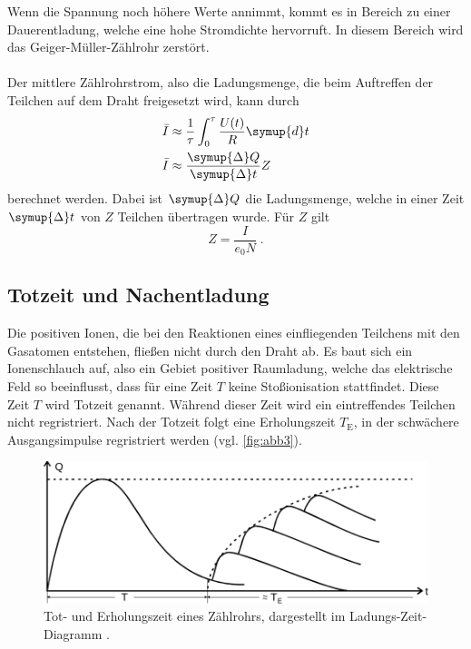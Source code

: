     Wenn die Spannung noch höhere Werte annimmt,
    kommt es in Bereich  zu einer Dauerentladung,
    welche eine hohe Stromdichte hervorruft.
    In diesem Bereich wird das Geiger-Müller-Zählrohr zerstört.\\
    \\
    Der mittlere Zählrohrstrom, also die Ladungsmenge,
    die beim Auftreffen der Teilchen auf dem Draht freigesetzt wird, kann durch
    \begin{align}
        \bar{I} &\approx \frac{1}{\tau} \int_0^{\tau}{\frac{U(t)}{R}} \symup{d}t \\
        \bar{I} &\approx \frac{\symup{\Delta}Q}{\symup{\Delta}t} Z
    \end{align}
    berechnet werden.
    Dabei ist $\symup{\Delta}Q$ die Ladungsmenge,
    welche in einer Zeit $\symup{\Delta}t$ von $Z$ Teilchen übertragen wurde.
    Für $Z$ gilt
    \begin{equation}
      \label{eqn:Teilchenzahl}
      Z = \frac{I}{e_0 N} \; .
    \end{equation}

\subsection{Totzeit und Nachentladung}

    Die positiven Ionen,
    die bei den Reaktionen eines einfliegenden Teilchens mit den Gasatomen entstehen,
    fließen nicht durch den Draht ab.
    Es baut sich ein Ionenschlauch auf, also ein Gebiet positiver Raumladung,
    welche das elektrische Feld so beeinflusst, dass für eine Zeit $T$ keine Stoßionisation stattfindet.
    Diese Zeit $T$ wird Totzeit genannt.
    Während dieser Zeit wird ein eintreffendes Teilchen nicht regristriert.
    Nach der Totzeit folgt eine Erholungszeit $T_\text{E}$,
    in der schwächere Ausgangsimpulse regristriert werden (vgl. \autoref{fig:abb3}).

    \begin{figure}
      \centering
      \includegraphics[width=\textwidth]{content/img/Abb_3.pdf}
      \caption{Tot- und Erholungszeit eines Zählrohrs, dargestellt im Ladungs-Zeit-Diagramm \cite{versuchsanleitung}.}
      \label{fig:abb3}
    \end{figure}

